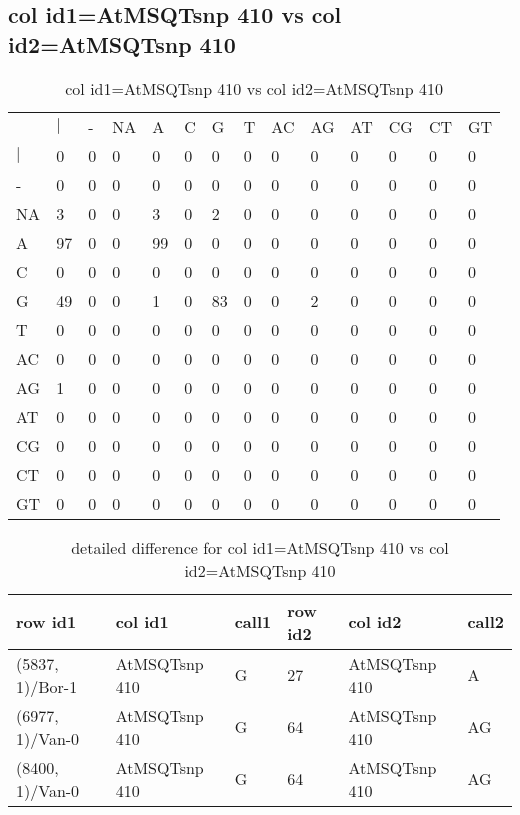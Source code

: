 \subsection{col id1=AtMSQTsnp 410 vs col id2=AtMSQTsnp 410}
\begin{center}
\begin{longtable}{|l|l|l|l|l|l|l|l|l|l|l|l|l|l|}
\caption{col id1=AtMSQTsnp 410 vs col id2=AtMSQTsnp 410} \label{table_dm924}\\
\hline
\\
\hline
&$|$&-&NA&A&C&G&T&AC&AG&AT&CG&CT&GT\\
$|$&0&0&0&0&0&0&0&0&0&0&0&0&0\\
-&0&0&0&0&0&0&0&0&0&0&0&0&0\\
NA&3&0&0&3&0&2&0&0&0&0&0&0&0\\
A&97&0&0&99&0&0&0&0&0&0&0&0&0\\
C&0&0&0&0&0&0&0&0&0&0&0&0&0\\
G&49&0&0&1&0&83&0&0&2&0&0&0&0\\
T&0&0&0&0&0&0&0&0&0&0&0&0&0\\
AC&0&0&0&0&0&0&0&0&0&0&0&0&0\\
AG&1&0&0&0&0&0&0&0&0&0&0&0&0\\
AT&0&0&0&0&0&0&0&0&0&0&0&0&0\\
CG&0&0&0&0&0&0&0&0&0&0&0&0&0\\
CT&0&0&0&0&0&0&0&0&0&0&0&0&0\\
GT&0&0&0&0&0&0&0&0&0&0&0&0&0\\
\hline
\end{longtable}
\end{center}

\begin{center}
\begin{longtable}{|l|l|l|l|l|l|}
\caption{detailed difference for col id1=AtMSQTsnp 410 vs col id2=AtMSQTsnp 410} \label{table_dm925}\\
\hline
row id1&col id1&call1&row id2&col id2&call2\\
\hline
(5837, 1)/Bor-1&AtMSQTsnp 410&G&27&AtMSQTsnp 410&A\\
(6977, 1)/Van-0&AtMSQTsnp 410&G&64&AtMSQTsnp 410&AG\\
(8400, 1)/Van-0&AtMSQTsnp 410&G&64&AtMSQTsnp 410&AG\\
\hline
\end{longtable}
\end{center}

